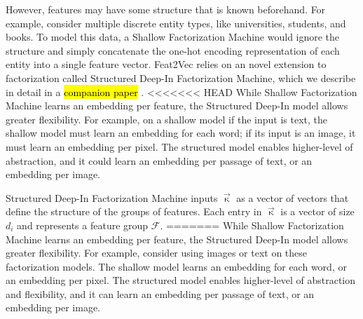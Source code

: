 \documentclass{article} %
\newcommand{\vect}[1]{\vec{#1}}
\renewcommand{\cite}[1]{\citep{#1}}
\begin{document}
However, features  may have some structure that is known beforehand.
For example, consider multiple discrete entity types, like universities, students, and books.
To model this data, a Shallow Factorization Machine would  ignore the structure and simply concatenate the one-hot encoding representation of each entity into a single feature vector.
Feat2Vec relies on an novel extension to factorization called  Structured Deep-In Factorization Machine, which we describe in detail in a \hl{companion paper} \cite{deepfm}.
<<<<<<< HEAD
While Shallow Factorization Machine  learns an embedding per feature, the Structured Deep-In model allows greater flexibility.
For example, on a shallow model if the input is text, the shallow model must learn an embedding for each word; if its input is an image,  it must learn an embedding per pixel.
The structured model enables higher-level of abstraction, and it could learn an embedding per passage of text, or an embedding per image.


Structured Deep-In Factorization Machine inputs $\vect{\upkappa}$  as a vector of vectors that define  the structure of the groups of features.
Each entry in $\vect{\upkappa}$  is a vector of size $d_i$ and represents a feature group $\mathcal{F}$.
=======
While Shallow Factorization Machine  learns an embedding per feature, the Structured Deep-In model allows greater flexibility.
For example, consider using images or text on these factorization models.
The shallow model learns an embedding for each word, or an embedding per pixel.
The structured model enables higher-level of abstraction and flexibility, and it can learn an embedding per passage of text, or an embedding per image.
\end{document}
